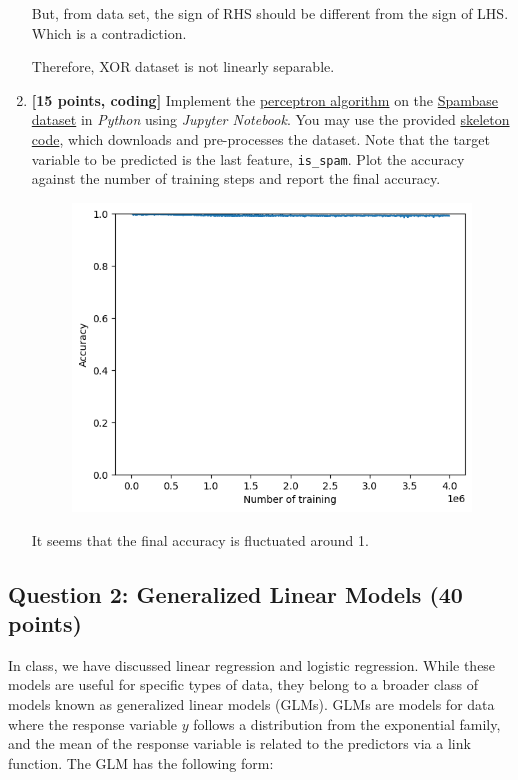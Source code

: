 \documentclass{article}
\begin{document}
\begin{enumerate}
    But, from data set, the sign of RHS should be different from the sign of LHS. Which is a contradiction.

    Therefore, XOR dataset is not linearly separable.

    \item \textbf{[15 points, coding]} Implement the \href{https://hongyanz.github.io/slides/cs480680_s23_Lecture2.pdf#page=13}{perceptron algorithm} on the \href{https://archive.ics.uci.edu/ml/datasets/spambase}{Spambase dataset} in \emph{Python} using \emph{Jupyter Notebook}. You may use the provided \href{https://colab.research.google.com/gist/jvhs0706/3f0778cc9fbbf4a077f752ea1edf956b/cs480-680-assignment1-coding.ipynb}{skeleton code}, which downloads and pre-processes the dataset. Note that the target variable to be predicted is the last feature, \texttt{is\_spam}. Plot the accuracy against the number of training steps and report the final accuracy.
    \begin{figure}
        \includegraphics[width=\linewidth]{IMG.png}
    \end{figure}

    It seems that the final accuracy is fluctuated around 1.
\end{enumerate}


\newpage
\subsection*{Question 2: Generalized Linear Models (40 points)}
In class, we have discussed linear regression and logistic regression. While these models are useful for specific types of data, they belong to a broader class of models known as generalized linear models (GLMs). GLMs are models for data where the response variable $y$ follows a distribution from the exponential family, and the mean of the response variable is related to the predictors via a link function. The GLM has the following form:
\end{document}
